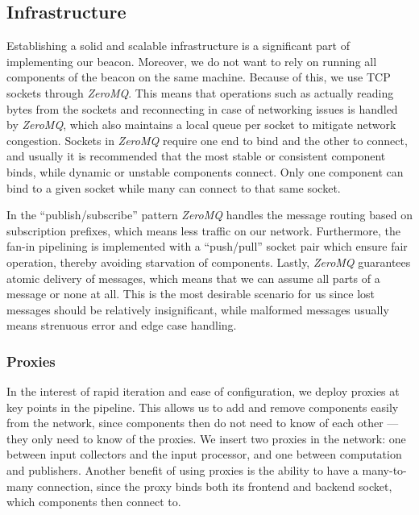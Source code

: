 \subsection{Infrastructure}%
\label{sub:infrastructure}
Establishing a solid and scalable infrastructure is a significant part of implementing our beacon.
Moreover, we do not want to rely on running all components of the beacon on the same machine.
Because of this, we use TCP sockets through \textit{ZeroMQ}.
This means that operations such as actually reading bytes from the sockets and reconnecting in case of networking issues is handled by \textit{ZeroMQ}, which also maintains a local queue per socket to mitigate network congestion.
Sockets in \textit{ZeroMQ} require one end to bind and the other to connect, and usually it is recommended that the most stable or consistent component binds, while dynamic or unstable components connect.
Only one component can bind to a given socket while many can connect to that same socket.

In the \enquote{publish/subscribe} pattern \textit{ZeroMQ} handles the message routing based on subscription prefixes, which means less traffic on our network.
Furthermore, the fan-in pipelining is implemented with a \enquote{push/pull} socket pair which ensure fair operation, thereby avoiding starvation of components.
Lastly, \textit{ZeroMQ} guarantees atomic delivery of messages, which means that we can assume all parts of a message or none at all. This is the most desirable scenario for us since lost messages should be relatively insignificant, while malformed messages usually means strenuous error and edge case handling.

\subsubsection{Proxies}
In the interest of rapid iteration and ease of configuration, we deploy proxies at key points in the pipeline.
This allows us to add and remove components easily from the network, since components then do not need to know of each other --- they only need to know of the proxies.
We insert two proxies in the network: one between input collectors and the input processor, and one between computation and publishers.
Another benefit of using proxies is the ability to have a many-to-many connection, since the proxy binds both its frontend and backend socket, which components then connect to.

